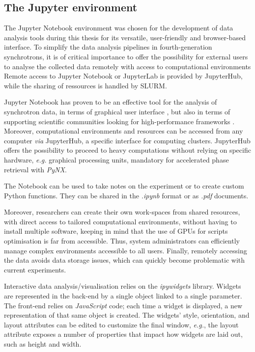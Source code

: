 \subsection{The Jupyter environment}

The Jupyter Notebook environment \parencite{IPython, Kluyver2016jupyter} was chosen for the development of data analysis tools during this thesis for its versatile, user-friendly and browser-based interface.
To simplify the data analysis pipelines in fourth-generation synchrotrons, it is of critical importance to offer the possibility for external users to analyse the collected data remotely with access to computational environments
Remote access to Jupyter Notebook or JupyterLab is provided by JupyterHub, while the sharing of ressources is handled by SLURM.

Jupyter Notebook has proven to be an effective tool for the analysis of synchrotron data, in terms of graphical user interface \parencite{Martini2019a,Simonne2020}, but also in terms of supporting scientific communities looking for high-performance frameworks \parencite{jupyter_computing_4, jupyter_computing_1, jupyter_computing_3, jupyter_computing_2, 9307800}.
Moreover, computational environments and resources can be accessed from any computer \textit{via} JupyterHub, a specific interface for computing clusters.
JupyterHub offers the possibility to proceed to heavy computations without relying on specific hardware, \textit{e.g.} graphical processing units, mandatory for accelerated phase retrieval with \textit{PyNX}.

The Notebook can be used to take notes on the experiment or to create custom Python functions.
They can be shared in the \textit{.ipynb} format or as \textit{.pdf} documents.

Moreover, researchers can create their own work-spaces from shared resources, with direct access to tailored computational environments, without having to install multiple software, keeping in mind that the use of GPUs for scripts optimisation is far from accessible.
Thus, system administrators can efficiently manage complex environments accessible to all users.
Finally, remotely accessing the data avoids data storage issues, which can quickly become problematic with current experiments.

Interactive data analysis/visualisation relies on the \textit{ipywidgets} library.
Widgets are represented in the back-end by a single object linked to a single parameter.
The front-end relies on \textit{JavaScript} code; each time a widget is displayed, a new representation of that same object is created.
The widgets' style, orientation, and layout attributes can be edited to customize the final window, \textit{e.g.}, the layout attribute exposes a number of properties that impact how widgets are laid out, such as height and width.

